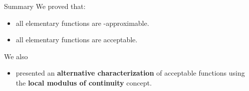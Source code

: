 \begin{frame}{Summary}
    We proved that:
    \pause
    \begin{itemize}
        \item all elementary functions are \WhileCC-approximable.
        \pause \item all elementary functions are acceptable.
    \end{itemize}
     \pause We also 
    \begin{itemize}
         \item  presented an \textbf{alternative characterization} of acceptable functions \pause using the \textbf{local modulus of continuity} concept.
    \end{itemize}
\end{frame}
